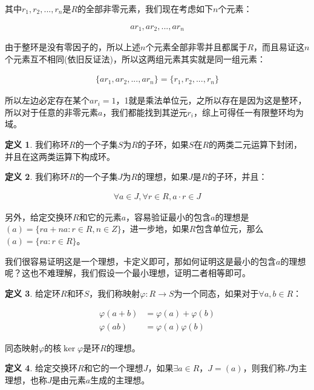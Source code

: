 \documentclass[12pt, a4paper, oneside]{ctexart}
\theoremstyle{definition}
\newtheorem*{definition}{定义}
\begin{document}
其中$r_1,r_2,...,r_n$是$R$的全部非零元素，我们现在考虑如下$n$个元素：

\begin{align*}
ar_1,ar_2,...,ar_n
\end{align*}

由于整环是没有零因子的，所以上述$n$个元素全部非零并且都属于$R$，而且易证这$n$个元素互不相同(依旧反证法)，所以这两组元素其实就是同一组元素：

\begin{align*}
\{ar_1,ar_2,...,ar_n\}=\{r_1,r_2,...,r_n\}
\end{align*}

所以左边必定存在某个$ar_i=1$，1就是乘法单位元，之所以存在是因为这是整环，所以对于任意的非零元素$a$，我们都能找到其逆元$r_i$，综上可得任一有限整环均为域。

\begin{definition}
我们称环$R$的一个子集$S$为$R$的子环，如果$S$在$R$的两类二元运算下封闭，并且在这两类运算下构成环。
\end{definition}

\begin{definition}
我们称环$R$的一个子集$J$为$R$的理想，如果$J$是$R$的子环，并且：

\begin{align*}
\forall a\in J,\forall r\in R,a\cdot r\in J
\end{align*}
\end{definition}

另外，给定交换环$R$和它的元素$a$，容易验证最小的包含$a$的理想是$(a)=\{ra+na:r\in R,n\in Z\}$，进一步地，如果$R$包含单位元，那么$(a)=\{ra:r\in R\}$。

我们很容易证明这是一个理想，卡定义即可，那如何证明这是最小的包含$a$的理想呢？这也不难理解，我们假设一个最小理想，证明二者相等即可。

\begin{definition}
给定环$R$和环$S$，我们称映射$\varphi:R\rightarrow S$为一个同态，如果对于$\forall a,b\in R$：

\begin{align*}
\varphi(a+b)&=\varphi(a)+\varphi(b)\\
\varphi(ab)&=\varphi(a)\varphi(b)
\end{align*}
\end{definition}

同态映射$\varphi$的核$\ker\varphi$是环$R$的理想。

\begin{definition}
给定交换环$R$和它的一个理想$J$，如果$\exists a\in R$，$J=(a)$，则我们称$J$为主理想，也称$J$是由元素$a$生成的主理想。
\end{definition}
\end{document}
